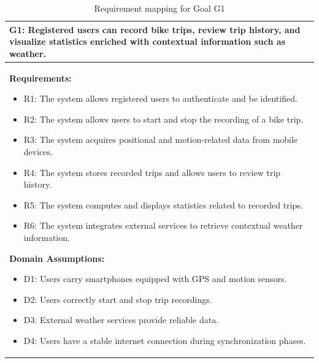 \begin{table}[H]
\centering
\renewcommand{\arraystretch}{1.2}
\begin{tabular}{|p{}|}
\hline
\textbf{G1:} Registered users can record bike trips, review trip history, and
visualize statistics enriched with contextual information such as weather. \\ \hline

\textbf{Requirements:}
\begin{itemize}
  \item R1: The system allows registered users to authenticate and be identified.
  \item R2: The system allows users to start and stop the recording of a bike trip.
  \item R3: The system acquires positional and motion-related data from mobile devices.
  \item R4: The system stores recorded trips and allows users to review trip history.
  \item R5: The system computes and displays statistics related to recorded trips.
  \item R6: The system integrates external services to retrieve contextual weather information.
\end{itemize}

\textbf{Domain Assumptions:}
\begin{itemize}
  \item D1: Users carry smartphones equipped with GPS and motion sensors.
  \item D2: Users correctly start and stop trip recordings.
  \item D3: External weather services provide reliable data.
  \item D4: Users have a stable internet connection during synchronization phases.
\end{itemize}
\\ \hline
\end{tabular}
\caption{Requirement mapping for Goal G1}
\end{table}

